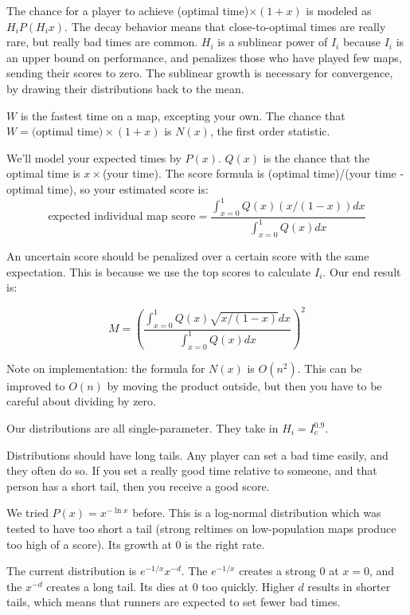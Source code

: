 The chance for a player to achieve (optimal time)$\times (1 + x)$ is modeled as $H_i P(H_i x)$. The decay behavior means that close-to-optimal times are really rare, but really bad times are common. $H_i$ is a sublinear power of $I_i$	 because $I_i$ is an upper bound on performance, and penalizes those who have played few maps, sending their scores to zero. The sublinear growth is necessary for convergence, by drawing their distributions back to the mean.

$W$ is the fastest time on a map, excepting your own. The chance that $W = \text{(optimal time)} \times (1 + x)$ is $N(x)$, the first order statistic.

We'll model your expected times by $P(x)$. $Q(x)$ is the chance that the optimal time is $x\times$(your time). The score formula is (optimal time)/(your time - optimal time), so your estimated score is:
\begin{equation}\text{expected individual map score} = \frac{\int_{x=0}^1 Q(x)\left(x/(1 - x)\right) dx}{\int_{x = 0}^1 Q(x) dx}\end{equation}

An uncertain score should be penalized over a certain score with the same expectation. This is because we use the top scores to calculate $I_i$. Our end result is:

\begin{equation}M = \left(\frac{\int_{x=0}^1 Q(x)\sqrt{x/(1-x)} dx}{\int_{x = 0}^1 Q(x) dx}\right)^2\end{equation}


Note on implementation: the formula for $N(x)$ is $O(n^2)$. This can be improved to $O(n)$ by moving the product outside, but then you have to be careful about dividing by zero.

\pagebreak
Our distributions are all single-parameter. They take in $H_i = I_c^{0.9}$.

Distributions should have long tails. Any player can set a bad time easily, and they often do so. If you set a really good time relative to someone, and that person has a short tail, then you receive a good score.

We tried $P(x)= x^{-\ln x}$ before. This is a log-normal distribution which was tested to have too short a tail (strong reltimes on low-population maps produce too high of a score). Its growth at 0 is the right rate.

The current distribution is $e^{-1/x}x^{-d}$. The $e^{-1/x}$ creates a strong $0$ at $x = 0$, and the $x^{-d}$ creates a long tail. Its dies at 0 too quickly. Higher $d$ results in shorter tails, which means that runners are expected to set fewer bad times.

